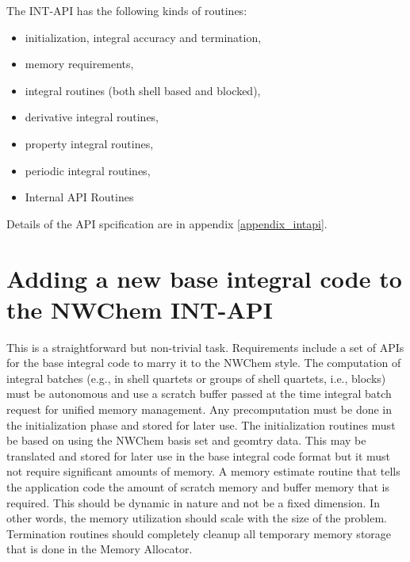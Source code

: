 The INT-API has the following kinds of routines: 
\begin{itemize} 
\item initialization, integral accuracy and termination, 
\item memory requirements, 
\item integral routines (both shell based and blocked), 
\item derivative integral routines, 
\item property integral routines, 
\item periodic integral routines, 
\item Internal API Routines 
\end{itemize} 
 
Details of the API spcification are in appendix \ref{appendix_intapi}. 
 
\section{Adding a new base integral code to the NWChem INT-API} 
 
This is a straightforward but non-trivial task.  Requirements include 
a set of APIs for the base integral code to marry it to the NWChem 
style.  The computation of integral batches (e.g., in shell quartets 
or groups of shell quartets, i.e., blocks) must be autonomous and use 
a scratch buffer passed at the time integral batch request for unified 
memory management.  Any precomputation must be done in the 
initialization phase and stored for later use.  The initialization 
routines must be based on using the NWChem basis set and geomtry data. 
This may be translated and stored for later use in the base integral 
code format but it must not require significant amounts of memory.  A 
memory estimate routine that tells the application code the amount of 
scratch memory and buffer memory that is required.  This should be 
dynamic in nature and not be a fixed dimension.  In other words, the 
memory utilization should scale with the size of the problem. 
Termination routines should completely cleanup all temporary memory 
storage that is done in the Memory Allocator.   
 
